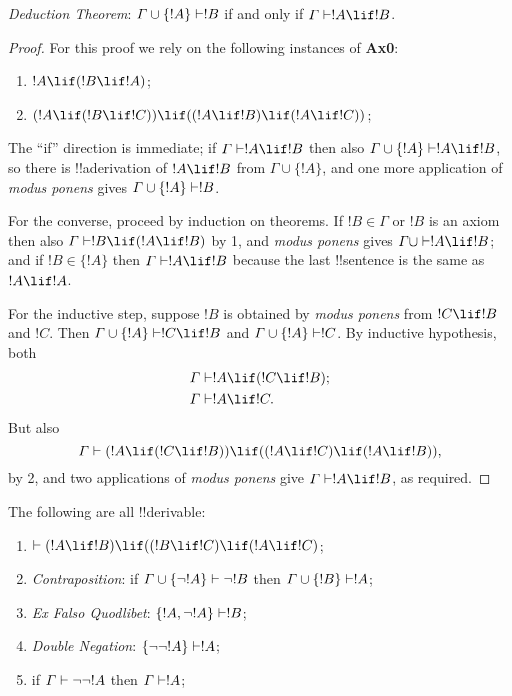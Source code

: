 \documentclass[../../include/open-logic-section]{subfiles}
\begin{document}
\begin{thm}
  \emph{Deduction Theorem}: $\Gamma \cup \{!A\} \Proves !B$ if
  and only if $\Gamma \Proves !A \lif !B$.
\end{thm}
\begin{proof}
For this proof we rely on the following instances of \textbf{Ax0}:
\begin{enumerate}
  \item $!A \lif (!B \lif !A)$;
  \item $(!A \lif (!B \lif !C)) \lif
    ((!A \lif !B) \lif (!A \lif !C))$;
\end{enumerate}

  The ``if'' direction is immediate; if $\Gamma \Proves !A \lif
  !B$ then also $\Gamma \cup \{!A\}\Proves !A \lif
  !B$, so there is !!a{derivation} of $!A\lif !B$ from $\Gamma \cup
  \{!A\}$, and one more application of \emph{modus ponens} gives
  $\Gamma \cup \{!A\} \Proves !B$.

  For the converse, proceed by induction on theorems. If $!B \in
  \Gamma$ or $!B$ is an axiom then also $\Gamma \Proves !B \lif
  (!A \lif !B)$ by 1, and \emph{modus ponens}
  gives $\Gamma\cup \Proves !A \lif !B$; and if $!B \in \{
  !A\}$ then $\Gamma \Proves !A \lif !B$ because the
  last !!{sentence} is the same as $!A \lif !A$.

  For the inductive step, suppose $!B$ is obtained by \emph{modus
    ponens} from $!C \lif !B$ and $!C$. Then $\Gamma \cup
  \{ !A\} \Proves !C \lif !B$ and $\Gamma \cup \{
  !A\} \Proves !C$. By inductive hypothesis, both 
  \begin{align*}
   & \Gamma \Proves !A \lif (!C \lif !B); \\
   & \Gamma \Proves !A \lif !C.
  \end{align*}
But also
\[
\Gamma \Proves (!A \lif (!C \lif !B)) \lif
((!A\lif !C)  \lif (!A \lif !B)),
\]
by 2, and two applications of \emph{modus ponens} give
$\Gamma \Proves !A \lif !B$, as required.
\end{proof}

\begin{prop}
  The following are all !!{derivable}:
  \begin{enumerate}
  \item $\Proves (!A \lif !B) \lif ((!B \lif !C)
    \lif (!A \lif !C)$; 
  \item \emph{Contraposition}: if $\Gamma \cup \{ \lnot !A\}
    \Proves \lnot !B$ then $\Gamma \cup \{ !B\} \Proves
    !A$; 
  \item \emph{Ex Falso Quodlibet}: $\{ !A, \lnot!A\} \Proves
    !B$; 
  \item \emph{Double Negation}: $\{ \lnot\lnot!A\} \Proves
    !A$;
  \item if $\Gamma \Proves \lnot\lnot!A$ then $\Gamma \Proves
    !A$;
\end{enumerate}
\end{prop}
\end{document}
